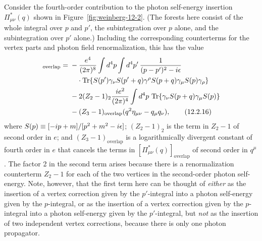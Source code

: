 Consider the fourth-order contribution to the photon self-energy insertion
$\Pi_{\mu\nu}^*(q)$ shown in Figure~\ref{fig:weinberg-12-2}. (The forests here
consist of the whole integral over $p$ and $p'$, the subintegration over $p$
alone, and the subintegration over $p'$ alone.) Including the corresponding
counterterms for the vertex parts and photon field renormalization, this has
the value
\begin{align}
 [\Pi_{\mu\nu}^*(q)]_{\mathrm{overlap}}
 ={}&-\frac{e^4}{(2\pi)^8}\int d^4p\int d^4p'\,
 \frac{1}{(p-p')^2-i\epsilon}
 \notag\\
 &\quad\cdot\operatorname{Tr}\!\left\{
 S(p')\gamma_\nu S(p'+q)\gamma^\rho
 S(p+q)\gamma_\mu S(p)\gamma_\rho\right\}
 \notag\\
 &-2(Z_2-1)_2\frac{i e^2}{(2\pi)^4}\int d^4p\,
 \operatorname{Tr}\!\left\{\gamma_\nu S(p+q)\gamma_\mu S(p)\right\}
 \notag\\
 &-(Z_3-1)_{\mathrm{overlap}}
 (q^2\eta_{\mu\nu}-q_\mu q_\nu),
 \tag{12.2.16}\label{eq:12.2.16}
\end{align}
where $S(p)\equiv[-i\sl{p}+m]/[p^2+m^2-i\epsilon]$;
$(Z_2-1)_2$ is the term in $Z_2-1$ of second order in $e$; and
$(Z_3-1)_{\mathrm{overlap}}$ is a logarithmically divergent constant of
fourth order in $e$ that cancels the terms in
$[\Pi_{\mu\nu}^*(q)]_{\mathrm{overlap}}$ of second order in $q^\mu$. The
factor 2 in the second term arises because there is a renormalization
counterterm $Z_2-1$ for each of the two vertices in the second-order photon
self-energy. Note, however, that the first term here can be thought of
\emph{either} as the insertion of a vertex correction given by the
$p'$-integral into a photon self-energy given by the $p$-integral, or as the
insertion of a vertex correction given by the $p$-integral into a photon
self-energy given by the $p'$-integral, but \emph{not} as the insertion of
two independent vertex corrections, because there is only one photon
propagator.

